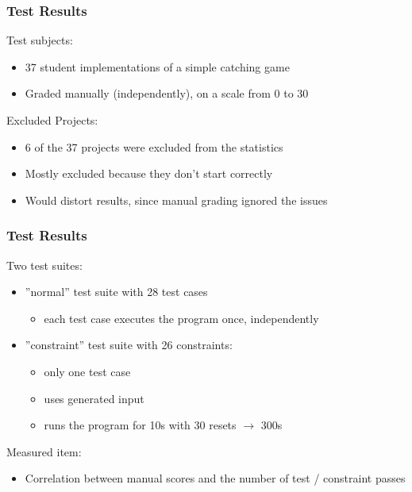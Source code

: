 \begin{frame}
\end{frame}

\begin{frame}
\end{frame}

\begin{frame}\frametitle{Test Results}
    Test subjects:
    \begin{itemize}
        \item \textcolor{upfim}{37 student implementations} of a simple catching game
        \item Graded manually (independently), on a scale from 0 to 30
    \end{itemize}

    \bigskip

    Excluded Projects:
    \begin{itemize}
        \item 6 of the 37 projects were excluded from the statistics
        \item Mostly excluded because they don't start correctly
        \item Would distort results, since manual grading ignored the issues
    \end{itemize}
\end{frame}

\begin{frame}\frametitle{Test Results}
    Two test suites:
    \begin{itemize}
        \item \textcolor{upfim}{''normal'' test suite} with 28 test cases
            \begin{itemize}
                \item each test case executes the program once, independently
            \end{itemize}
        \item \textcolor{upfim}{''constraint'' test suite} with 26 constraints:
            \begin{itemize}
                \item only one test case
                \item uses generated input
                \item runs the program for 10s with 30 resets $\rightarrow$ 300s
            \end{itemize}
    \end{itemize}

    \bigskip

    Measured item:
    \begin{itemize}
        \item Correlation between manual scores and the number of test / constraint passes
    \end{itemize}

\end{frame}

